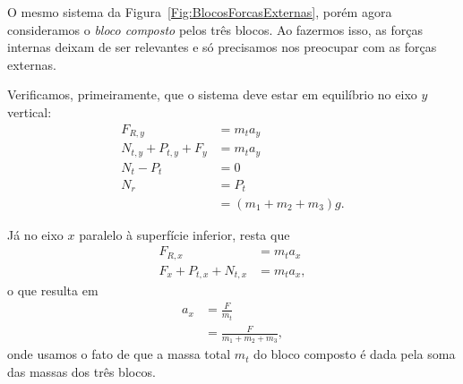 \begin{marginfigure}[2cm]
\centering
{}
\caption{O mesmo sistema da Figura~\ref{Fig:BlocosForcasExternas}, porém agora consideramos o \emph{bloco composto} pelos três blocos. Ao fazermos isso, as forças internas deixam de ser relevantes e só precisamos nos preocupar com as forças externas.\label{Fig:BlocosForcasExternasComposto}}
\end{marginfigure}

Verificamos, primeiramente, que o sistema deve estar em equilíbrio no eixo $y$ vertical: 
\begin{align}
    F_{R, y} &= m_t a_y \\
    N_{t, y} + P_{t, y} + F_y &= m_t a_y \\
    N_t - P_t &= 0 \\
    N_r &= P_t \\
    &= (m_1 + m_2 + m_3) g.
\end{align}

Já no eixo $x$ paralelo à superfície inferior, resta que
\begin{align}
    F_{R, x} &= m_t a_x \\
    F_x + P_{t, x} + N_{t, x} &= m_t a_x,
 \end{align}
 o que resulta em
\begin{align}
    a_x &= \frac{F}{m_t} \\
    &= \frac{F}{m_1 + m_2 + m_3},
\end{align}
%
onde usamos o fato de que a massa total $m_t$ do bloco composto é dada pela soma das massas dos três blocos.

